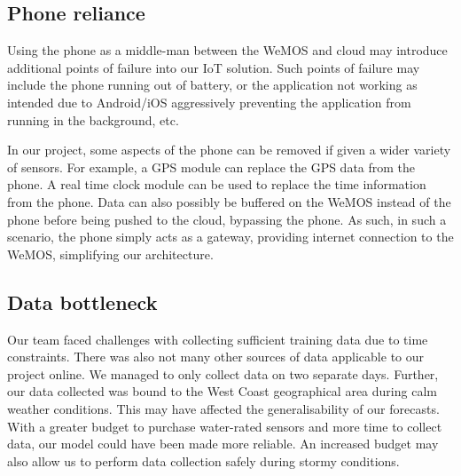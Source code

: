\documentclass{article}
\begin{document}
\subsection{Phone reliance}
\begin{multicols}{2}
Using the phone as a middle-man between the WeMOS and cloud may introduce additional points of failure into our IoT solution. Such points of failure may include the phone running out of battery, or the application not working as intended due to Android/iOS aggressively preventing the application from running in the background, etc.

In our project, some aspects of the phone can be removed if given a wider variety of sensors. For example, a GPS module can replace the GPS data from the phone. A real time clock module can be used to replace the time information from the phone. Data can also possibly be buffered on the WeMOS instead of the phone before being pushed to the cloud, bypassing the phone. As such, in such a scenario, the phone simply acts as a gateway, providing internet connection to the WeMOS, simplifying our architecture.


\end{multicols}

\subsection{Data bottleneck}

\begin{multicols}{2}
Our team faced challenges with collecting sufficient training data due to time constraints. There was also not many other sources of data applicable to our project online. We managed to only collect data on two separate days. Further, our data collected was bound to the West Coast geographical area during calm weather conditions. This may have affected the generalisability of our forecasts. With a greater budget to purchase water-rated sensors and more time to collect data, our model could have been made more reliable. An increased budget may also allow us to perform data collection safely during stormy conditions.
\end{multicols}
\end{document}
